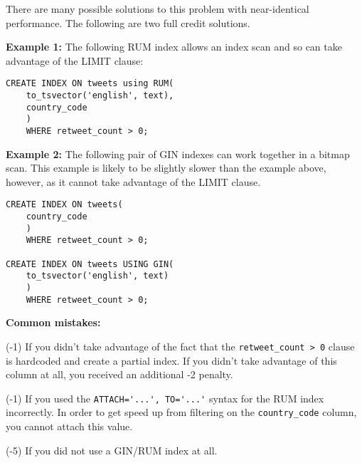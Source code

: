\documentclass[12pt]{exam}
\theoremstyle{definition}
\begin{document}
\begin{questions}
\noindent

\begin{solution}
There are many possible solutions to this problem with near-identical performance.
The following are two full credit solutions.

\textbf{Example 1:}
The following RUM index allows an index scan and so can take advantage of the LIMIT clause:

\begin{lstlisting}
CREATE INDEX ON tweets using RUM(
    to_tsvector('english', text),
    country_code
    )
    WHERE retweet_count > 0;
\end{lstlisting}

\textbf{Example 2:}
The following pair of GIN indexes can work together in a bitmap scan.
This example is likely to be slightly slower than the example above, however, as it cannot take advantage of the LIMIT clause.

\begin{lstlisting}
CREATE INDEX ON tweets(
    country_code
    )
    WHERE retweet_count > 0;

CREATE INDEX ON tweets USING GIN(
    to_tsvector('english', text)
    )
    WHERE retweet_count > 0;
\end{lstlisting}

\textbf{Common mistakes:}

(-1) If you didn't take advantage of the fact that the \lstinline{retweet_count > 0} clause is hardcoded and create a partial index.
If you didn't take advantage of this column at all, you received an additional -2 penalty.

(-1)
    If you used the \lstinline{ATTACH='...', TO='...'} syntax for the RUM index incorrectly.
    In order to get speed up from filtering on the \lstinline{country_code} column,
    you cannot attach this value.

(-5) If you did not use a GIN/RUM index at all.
\end{solution}

\newpage
{}
\end{questions}
\end{document}
